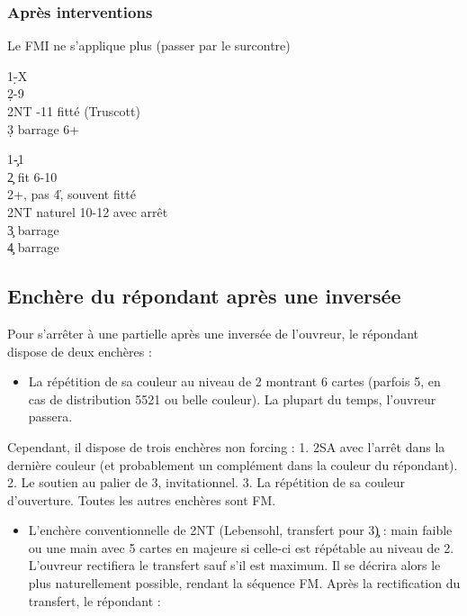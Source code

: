 \documentclass[a4paper]{article}
\begin{document}
\subsubsection{Après interventions}

Le FMI ne s'applique plus (passer par le surcontre)

\begin{bidtable}
1\d-X\+\\
2\d {}-9\\
2NT -11 fitté (Truscott)\\
3\d \> barrage 6+\-
\end{bidtable}

\begin{bidtable}
1\c-1\s\+\\
2\c \> fit 6-10\\
2\s {}+, pas 4\h , souvent fitté \c \\
2NT \> naturel 10-12 avec arrêt\\
3\c \> barrage\\
4\c \> barrage\-
\end{bidtable}

\subsection{Enchère du répondant après une inversée}

Pour s'arrêter à une partielle après une inversée de l'ouvreur, le répondant dispose de deux enchères :

\begin{itemize}
\item La répétition de sa couleur au niveau de 2 montrant 6 cartes (parfois 5, en cas de distribution 5521 ou belle couleur).
  La plupart du temps, l'ouvreur passera.

\end{itemize}

Cependant, il dispose de trois enchères non forcing :
1. 2SA avec l'arrêt dans la dernière couleur (et probablement un complément dans la couleur du répondant).
2. Le soutien au palier de 3, invitationnel.
3. La répétition de sa couleur d'ouverture.
Toutes les autres enchères sont FM.

\begin{itemize}
\item L'enchère conventionnelle de 2NT (Lebensohl, transfert pour 3\c ) : main faible ou une main avec 5 cartes en majeure si celle-ci est répétable au niveau de 2.
L'ouvreur rectifiera le transfert sauf s'il est maximum. Il se décrira alors le plus naturellement possible, rendant la séquence FM.
Après la rectification du transfert, le répondant :

\end{itemize}
\end{document}
